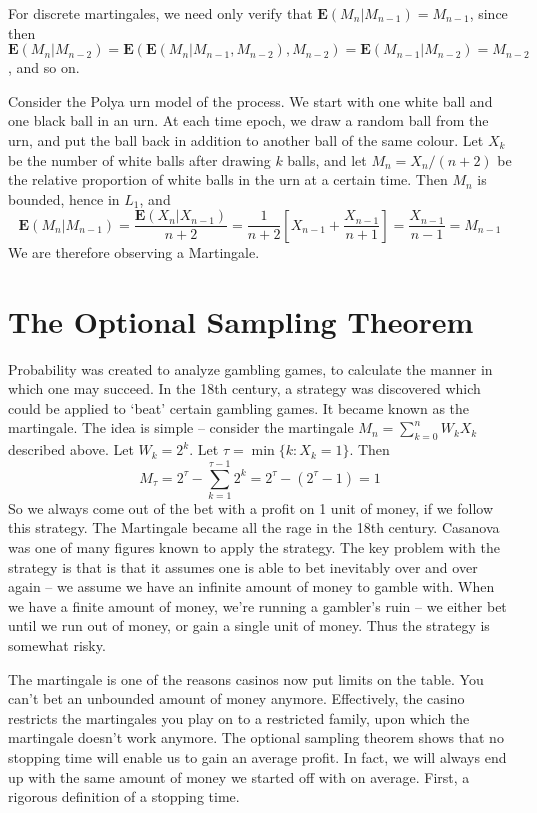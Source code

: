 For discrete martingales, we need only verify that $\mathbf{E}(M_n | M_{n-1}) = M_{n-1}$, since then $\mathbf{E}(M_n | M_{n-2}) = \mathbf{E}(\mathbf{E}(M_n | M_{n-1}, M_{n-2}), M_{n-2}) = \mathbf{E}(M_{n-1} | M_{n-2}) = M_{n-2}$, and so on.

\begin{example}
    Consider the Polya urn model of the process. We start with one white ball and one black ball in an urn. At each time epoch, we draw a random ball from the urn, and put the ball back in addition to another ball of the same colour. Let $X_k$ be the number of white balls after drawing $k$ balls, and let $M_n = X_n / (n+2)$ be the relative proportion of white balls in the urn at a certain time. Then $M_n$ is bounded, hence in $L_1$, and
    \[ \mathbf{E}(M_n | M_{n-1}) = \frac{\mathbf{E}(X_n | X_{n-1})}{n+2} = \frac{1}{n+2} [ X_{n-1} + \frac{X_{n-1}}{n+1} ] = \frac{X_{n-1}}{n-1} = M_{n-1} \]
    We are therefore observing a Martingale.
\end{example}

\section{The Optional Sampling Theorem}

Probability was created to analyze gambling games, to calculate the manner in which one may succeed. In the 18th century, a strategy was discovered which could be applied to `beat' certain gambling games. It became known as the martingale. The idea is simple -- consider the martingale $M_n = \sum_{k = 0}^n W_k X_k$ described above. Let $W_k = 2^k$. Let $\tau = \min \{ k : X_k = 1 \}$. Then
%
\[ M_\tau = 2^\tau - \sum_{k = 1}^{\tau-1} 2^k = 2^\tau - (2^\tau - 1) = 1 \]
%
So we always come out of the bet with a profit on 1 unit of money, if we follow this strategy. The Martingale became all the rage in the 18th century. Casanova was one of many figures known to apply the strategy. The key problem with the strategy is that is that it assumes one is able to bet inevitably over and over again --  we assume we have an infinite amount of money to gamble with. When we have a finite amount of money, we're running a gambler's ruin -- we either bet until we run out of money, or gain a single unit of money. Thus the strategy is somewhat risky.

The martingale is one of the reasons casinos now put limits on the table. You can't bet an unbounded amount of money anymore. Effectively, the casino restricts the martingales you play on to a restricted family, upon which the martingale doesn't work anymore. The optional sampling theorem shows that no stopping time will enable us to gain an average profit. In fact, we will always end up with the same amount of money we started off with on average. First, a rigorous definition of a stopping time.

